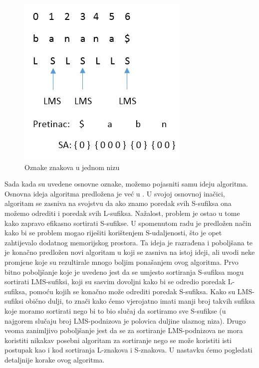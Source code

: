 \begin{figure}[h]
   \centering
       \includegraphics{./pictures/charactertypes.jpg}
 \caption{Oznake znakova u jednom nizu}
 \label{fig:oznake}
\end{figure}

Sada kada su uvedene osnovne oznake, možemo pojasniti samu ideju algoritma. Osnovna ideja algoritma predložena je već u \cite{ka}. U svojoj osnovnoj inačici, algoritam se zasniva na svojstvu da ako znamo poredak svih S-sufiksa ona možemo odrediti i poredak svih L-sufiksa. Nažalost, problem je ostao u tome kako zapravo efikasno sortirati S-sufikse. U spomenutom radu je predložen način kako bi se problem mogao riješiti korištenjem S-udaljenosti, što je opet zahtijevalo dodatnog memorijskog prostora. Ta ideja je razrađena i poboljšana te je konačno predložen novi algoritam u \cite{sais1} koji se zasniva na istoj ideji, ali uvodi neke promjene koje su rezultirale mnogo boljim ponašanjem ovog algoritma. Prvo bitno poboljšanje koje je uvedeno jest da se umjesto sortiranja S-sufiksa mogu sortirati LMS-sufiksi, koji su sasvim dovoljni kako bi se odredio poredak L-sufiksa, pomoću kojih se konačno može odrediti poredak S-sufiksa. Kako su LMS-sufiksi obično dulji, to znači kako ćemo vjerojatno imati manji broj takvih sufiksa koje moramo sortirati nego bi to bio slučaj da sortiramo sve S-sufikse (u najgorem slučaju broj LMS-podnizova je polovica duljine ulaznog niza). Drugo veoma zanimljivo poboljšanje jest da se za sortiranje LMS-podnizova ne mora koristiti nikakav posebni algoritam za sortiranje nego se može koristiti isti postupak kao i kod sortiranja L-znakova i S-znakova. U nastavku ćemo pogledati detaljnije korake ovog algoritma. 

